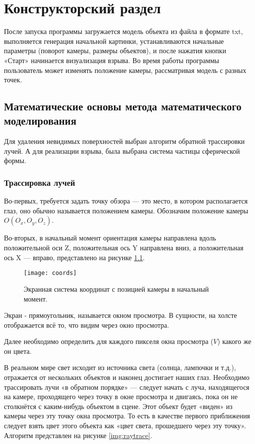 \chapter{\textbf{Конструкторский раздел}}

\hfill

После запуска программы загружается модель объекта из файла в формате txt, выполняется генерация начальной картинки, устанавливаются начальные параметры (поворот камеры, размеры объектов), и после нажатия кнопки «Старт» начинается визуализация взрыва. Во время работы программы пользователь может изменять положение камеры, рассматривая модель с разных точек. 

\section{\textbf{Математические основы метода математического моделирования}}

\hfill

Для удаления невидимых поверхностей выбран алгоритм обратной трассировки лучей. А для реализации взрыва, была выбрана система частицы сферической формы. 

\subsection{\textbf{Трассировка лучей}}

\hfill

Во-первых, требуется задать точку обзора — это место, в котором располагается глаз, оно обычно называется положением камеры. Обозначим положение камеры $O(O_x, O_y, O_z)$. 

Во-вторых, в начальный момент ориентация камеры направлена вдоль положительной оси Z, положительная ось Y направлена вниз, а положительная ось X --- вправо, представлено на рисунке \ref{img:coords}. 

\begin{figure}[H]
	\centering
	\texttt{[image: coords]}
	\caption{Экранная система координат с позицией камеры в начальный момент. }
	\label{img:coords}
\end{figure}

Экран - прямоугольник, называется окном просмотра. В сущности, на холсте отображается всё то, что видим через окно просмотра.

Далее необходимо определить для каждого пикселя окна просмотра ($V$) какого же он цвета.

В реальном мире свет исходит из источника света (солнца, лампочки и т.д.), отражается от нескольких объектов и наконец достигает наших глаз. Необходимо трассировать лучи «в обратном порядке» --- следует начать с луча, находящегося на камере, проходящего через точку в окне просмотра и двигаясь, пока он не столкнётся с каким-нибудь объектом в сцене. Этот объект будет «виден» из камеры через эту точку окна просмотра. То есть в качестве первого приближения следует взять цвет этого объекта как «цвет света, прошедшего через эту точку».
Алгоритм представлен на рисунке \ref{img:raytrace}. 

